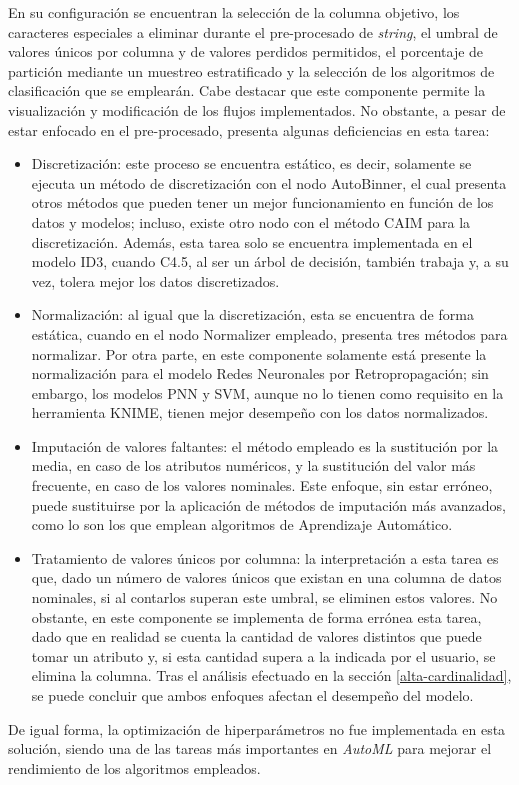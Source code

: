 En su configuración se encuentran la selección de la columna objetivo, los caracteres especiales a eliminar durante el pre-procesado de \textit{string}, el umbral de valores únicos por columna y de valores perdidos permitidos, el porcentaje de partición mediante un muestreo estratificado y la selección de los algoritmos de clasificación que se emplearán. Cabe destacar que este componente permite la visualización y modificación de los flujos implementados. No obstante, a pesar de estar enfocado en el pre-procesado, presenta algunas deficiencias en esta tarea:
\begin{itemize}
	\item Discretización: este proceso se encuentra estático, es decir, solamente se ejecuta un método de discretización con el nodo AutoBinner, el cual presenta otros métodos que pueden tener un mejor funcionamiento en función de los datos y modelos; incluso, existe otro nodo con el método CAIM para la discretización. Además, esta tarea solo se encuentra implementada en el modelo ID3, cuando C4.5, al ser un árbol de decisión, también trabaja y, a su vez, tolera mejor los datos discretizados.
	\item Normalización: al igual que la discretización, esta se encuentra de forma estática, cuando en el nodo Normalizer empleado, presenta tres métodos para normalizar. Por otra parte, en este componente solamente está presente la normalización para el modelo Redes Neuronales por Retropropagación; sin embargo, los modelos PNN y SVM, aunque no lo tienen como requisito en la herramienta KNIME, tienen mejor desempeño con los datos normalizados.
	\item Imputación de valores faltantes: el método empleado es la sustitución por la media, en caso de los atributos numéricos, y la sustitución del valor más frecuente, en caso de los valores nominales. Este enfoque, sin estar erróneo, puede sustituirse por la aplicación de métodos de imputación más avanzados, como lo son los que emplean algoritmos de Aprendizaje Automático.
	\item Tratamiento de valores únicos por columna: la interpretación a esta tarea es que, dado un número de valores únicos que existan en una columna de datos nominales, si al contarlos superan este umbral, se eliminen estos valores. No obstante, en este componente se implementa de forma errónea esta tarea, dado que en realidad se cuenta la cantidad de valores distintos que puede tomar un atributo y, si esta cantidad supera a la indicada por el usuario, se elimina la columna. Tras el análisis efectuado en la sección \ref{alta-cardinalidad}, se puede concluir que ambos enfoques afectan el desempeño del modelo.
\end{itemize}
De igual forma, la optimización de hiperparámetros no fue implementada en esta solución, siendo una de las tareas más importantes en \textit{AutoML} para mejorar el rendimiento de los algoritmos empleados.

